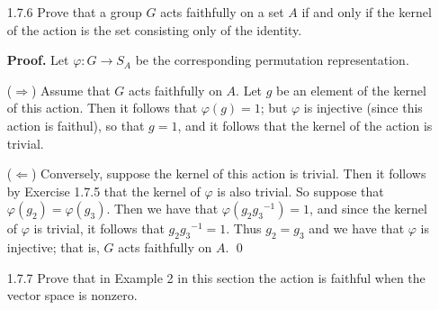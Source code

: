 \begin{enumerate}
      \textbf{Proof.} Let $K_1$ be the kernel of the action of $G$ on $A$ and
      let $K_2$ be the kernel of the permutation representation
      $\varphi : G \rightarrow S_A$. The proof follows since
      \begin{align*}
         g \in K_1 &\Longleftrightarrow ga = a \quad\text{ for all } a \in A \\
            &\Longleftrightarrow \varphi(g)(a)=a\quad\text{ for all } a\in A \\
            &\Longleftrightarrow \varphi(g) = 1 \\
            &\Longleftrightarrow g \in K_2.
      \end{align*} \qed
   \item[1.7.6]   Prove that a group $G$ acts faithfully on a set $A$ if and
                  only if the kernel of the action is the set consisting only of
                  the identity.

      \textbf{Proof.} Let $\varphi : G \rightarrow S_A$ be the corresponding 
      permutation representation.

      ($\Rightarrow$) Assume that $G$ acts faithfully on $A$. Let $g$ be an
      element of the kernel of this action. Then it follows that
      $\varphi(g) = 1$; but $\varphi$ is injective (since this action is
      faithul), so that $g = 1$, and it follows that the kernel of the action is
      trivial.

      ($\Leftarrow$) Conversely, suppose the kernel of this action is trivial.
      Then it follows by Exercise 1.7.5 that the kernel of $\varphi$ is also
      trivial. So suppose that $\varphi(g_2) = \varphi(g_3)$. Then we have
      that $\varphi(g_2{g_3}^{-1}) = 1$, and since the kernel of $\varphi$ is 
      trivial, it follows that $g_2{g_3}^{-1} = 1$. Thus $g_2 = g_3$ and we
      have that $\varphi$ is injective; that is, $G$ acts faithfully on $A$.
      \qed
   \item[1.7.7]   Prove that in Example 2 in this section the action is
                  faithful when the vector space is nonzero.


\end{enumerate}
